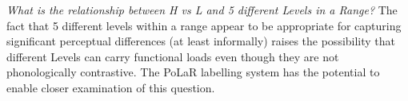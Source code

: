 \documentclass[11pt, twoside]{memoir}
\def\textlabel#1{{\relsize{-.5}\fontspec[Mapping=tex-text]{Roboto Mono}{#1}}}
\begin{document}
\textit{What is the relationship between H vs L and 5 different Levels in a Range?}  The fact that 5 different levels within a range appear to be appropriate for capturing significant perceptual differences (at least informally) raises the possibility that different Levels can carry functional loads even though they are not phonologically contrastive.  The PoLaR labelling system has the potential to enable closer examination of this question.
%
%
%
%
\end{document}
